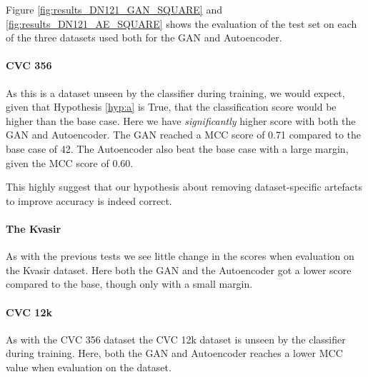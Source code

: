 %
Figure \ref{fig:results_DN121_GAN_SQUARE} and \ref{fig:results_DN121_AE_SQUARE} shows the evaluation of the test set on each of the three datasets used both for the GAN and Autoencoder. 

\paragraph{CVC 356}
As this is a dataset unseen by the classifier during training, we would expect, given that Hypothesis \ref{hyp:a} is True, that the classification score would be higher than the base case.
Here we have \textit{significantly} higher score with both the GAN and Autoencoder. 
The GAN reached a MCC score of 0.71 compared to the base case of 42. The Autoencoder also beat the base case with a large margin, given the MCC score of 0.60.

This highly suggest that our hypothesis about removing dataset-specific artefacts to improve accuracy is indeed correct. 

\paragraph{The Kvasir}
As with the previous tests we see little change in the scores when evaluation on the Kvasir dataset.
Here both the GAN and the Autoencoder got a lower score compared to the base, though only with a small margin.


\paragraph{CVC 12k}
As with the CVC 356 dataset the CVC 12k dataset is unseen by the classifier during training. 
Here, both the GAN and Autoencoder reaches a lower MCC value when evaluation on the dataset. 















































